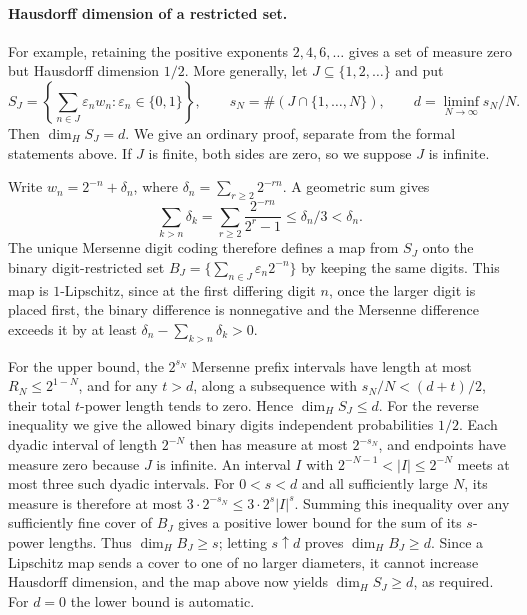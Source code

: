 \paragraph{Hausdorff dimension of a restricted set.}
For example, retaining the positive exponents $2,4,6,\ldots$ gives
a set of measure zero but Hausdorff dimension $1/2$.  More generally,
let $J\subseteq\{1,2,\ldots\}$ and put
\[
 S_J=\left\{\sum_{n\in J}\varepsilon_nw_n:
                  \varepsilon_n\in\{0,1\}\right\},\qquad
 s_N=\#(J\cap\{1,\ldots,N\}),\qquad
 d=\liminf_{N\to\infty}s_N/N.
\]
Then $\dim_H S_J=d$. We give an ordinary proof, separate from the
formal statements above. If $J$ is finite, both sides are zero, so we
suppose $J$ is infinite.

Write $w_n=2^{-n}+\delta_n$, where
$\delta_n=\sum_{r\ge2}2^{-rn}$.  A geometric sum gives
\[
 \sum_{k>n}\delta_k
 =\sum_{r\ge2}\frac{2^{-rn}}{2^r-1}\le\delta_n/3<\delta_n.
\]
The unique Mersenne digit coding therefore defines a map from $S_J$
onto the binary digit-restricted set
$B_J=\{\sum_{n\in J}\varepsilon_n2^{-n}\}$ by keeping the same digits.
This map is $1$-Lipschitz, since at the first differing digit $n$, once
the larger digit is placed first, the binary difference is nonnegative
and the Mersenne difference exceeds it by at least
$\delta_n-\sum_{k>n}\delta_k>0$.

For the upper bound, the $2^{s_N}$ Mersenne prefix intervals have length
at most $R_N\le2^{1-N}$, and for any $t>d$, along a subsequence with
$s_N/N<(d+t)/2$, their total $t$-power length tends to zero. Hence
$\dim_H S_J\le d$. For the reverse inequality we give the allowed binary
digits independent probabilities $1/2$. Each dyadic interval of length
$2^{-N}$ then has measure at most $2^{-s_N}$, and endpoints have measure
zero because $J$ is infinite.  An interval $I$ with
$2^{-N-1}<|I|\le2^{-N}$ meets at most three such dyadic intervals.
For $0<s<d$ and all sufficiently large $N$, its measure is therefore
at most $3\cdot2^{-s_N}\le3\cdot2^s|I|^s$.
Summing this inequality over any sufficiently fine cover of $B_J$
gives a positive lower bound for the sum of its $s$-power lengths.
Thus $\dim_H B_J\ge s$; letting $s\uparrow d$ proves
$\dim_H B_J\ge d$. Since a Lipschitz map sends a cover to one of no
larger diameters, it cannot increase Hausdorff dimension, and the map
above now yields $\dim_H S_J\ge d$, as required.
For $d=0$ the lower bound is automatic.

